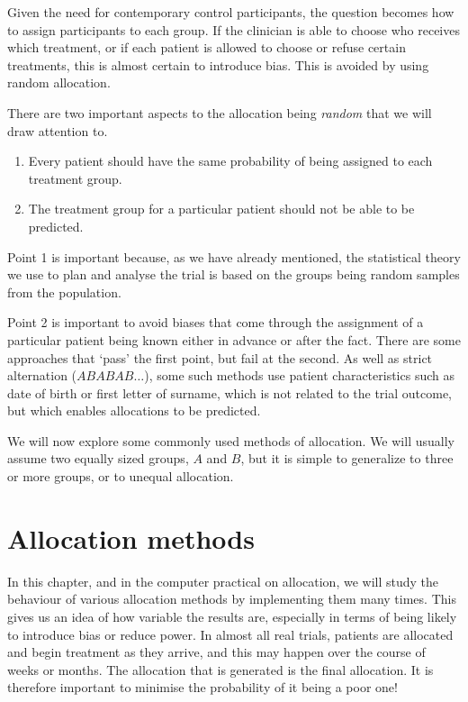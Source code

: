 \documentclass[
  openany]{book}
\providecommand{\tightlist}{%
  \setlength{\itemsep}{0pt}\setlength{\parskip}{0pt}}
\theoremstyle{definition}
\theoremstyle{definition}
\theoremstyle{definition}
\theoremstyle{definition}
\theoremstyle{remark}
\begin{document}
Given the need for contemporary control participants, the question becomes how to assign participants to each group. If the clinician is able to choose who receives which treatment, or if each patient is allowed to choose or refuse certain treatments, this is almost certain to introduce bias. This is avoided by using random allocation.

There are two important aspects to the allocation being \emph{random} that we will draw attention to.

\begin{enumerate}
\def\labelenumi{\arabic{enumi}.}
\tightlist
\item
  Every patient should have the same probability of being assigned to each treatment group.
\item
  The treatment group for a particular patient should not be able to be predicted.
\end{enumerate}

Point 1 is important because, as we have already mentioned, the statistical theory we use to plan and analyse the trial is based on the groups being random samples from the population.

Point 2 is important to avoid biases that come through the assignment of a particular patient being known either in advance or after the fact. There are some approaches that `pass' the first point, but fail at the second. As well as strict alternation (\(ABABAB\ldots\)), some such methods use patient characteristics such as date of birth or first letter of surname, which is not related to the trial outcome, but which enables allocations to be predicted.

We will now explore some commonly used methods of allocation. We will usually assume two equally sized groups, \(A\) and \(B\), but it is simple to generalize to three or more groups, or to unequal allocation.

\section{Allocation methods}\label{sec-allocation}

In this chapter, and in the computer practical on allocation, we will study the behaviour of various allocation methods by implementing them many times. This gives us an idea of how variable the results are, especially in terms of being likely to introduce bias or reduce power. In almost all real trials, patients are allocated and begin treatment as they arrive, and this may happen over the course of weeks or months. The allocation that is generated is the final allocation. It is therefore important to minimise the probability of it being a poor one!
\end{document}
